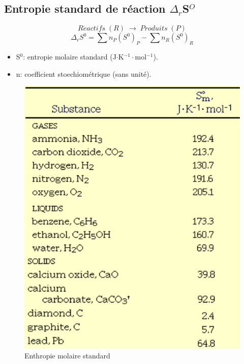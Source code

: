 \documentclass[10pt,a4paper]{book}
\begin{document}
\subsection{Entropie standard de réaction $\Delta_r$S$^O$}

\begin{displaymath}
R\acute{e}actifs \; (R) \; \longrightarrow \; Produits \; (P)
\end{displaymath}
\begin{displaymath}
\Delta_r S^0 = \sum n_P(S^0)_P - \sum n_R(S^0)_R 
\end{displaymath}
\begin{itemize}
\item S$^0$: entropie molaire standard (J$\cdot$K$^{-1}\cdot$mol$^{-1}$).
\item n: coefficient stoechiométrique (sans unité).
\end{itemize}
\begin{figure}[h!]
\begin{center}
\includegraphics[scale=0.75]{./assets/enthropy_standards.png}
\caption{Enthropie molaire standard}
\label{fig:enthropy_molar}
\end{center}
\end{figure}
\end{document}
